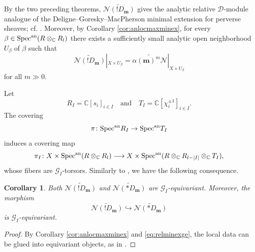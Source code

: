 \documentclass{amsart}
\theoremstyle{plain}
\numberwithin{theorem}{section}
\newtheorem{coro}[theorem]{Corollary}
\theoremstyle{definition}
\theoremstyle{remark}
\theoremstyle{definition}
\newcommand{\wt}{\widetilde}
\newcommand{\C}{\mathbb{C}} %
\newcommand{\cN}{\mathcal{N}}
\newcommand{\bm}{\mathbf{m}}
\newcommand{\sG}{\mathscr{G}}
\newcommand{\shD}{\mathscr{D}}
\newcommand{\Specan}{\textup{Spec}^{\textup{an}}}
\begin{document}
By the two preceding theorems, $\wt{\cN(!D_\bm)}$ gives the analytic relative
$\shD$-module analogue of the Deligne--Goresky--MacPherson minimal extension
for perverse sheaves; cf. \cite[\S 8.2.1]{HTT}. Moreover, by
Corollary \ref{cor:anlocmaxminex}, for every
$\beta\in \Specan(R\otimes_\C R_l)$
there exists a sufficiently small analytic open neighborhood $U_\beta$ of
$\beta$ such that
\begin{equation}\label{eq:relminexge}
\wt{\cN(!D_\bm)}|_{X\times U_\beta}
=
\widetilde{\alpha(\bm)^m\cN}|_{X\times U_\beta}
\end{equation}
for all $m\gg 0$.

Let
\[
R_I=\C[s_i]_{i\in I}
\quad \text{and} \quad
T_I=\C[\chi_i^{\pm1}]_{i\in I}.
\]
The covering
\[
\pi\colon \Specan R_I\to \Specan T_I
\]
induces a covering map
\[
\pi_I\colon
X\times\Specan(R\otimes_\C R_l)
\longrightarrow
X\times\Specan(R\otimes_\C R_{l-|I|}\otimes_\C T_I),
\]
whose fibers are $\sG_I$-torsors. Similarly to \cite[Thm.2.8]{WuRHA}, we
have the following consequence.

\begin{coro}
Both $\wt{\cN(!D_\bm)}$ and $\wt{\cN(*D_\bm)}$ are $\sG_I$-equivariant. Moreover,
the morphism
\[
\wt{\cN(!D_\bm)}
\hookrightarrow
\wt{\cN(*D_\bm)}
\]
is $\sG_I$-equivariant.
\end{coro}

\begin{proof}
By Corollary \ref{cor:anlocmaxminex} and \eqref{eq:relminexge}, the local data
can be glued into equivariant objects, as in \cite[\S 2.4]{WuRHA}.
\end{proof}
\end{document}
